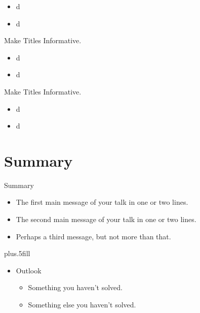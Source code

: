 \documentclass{beamer}
\begin{document}
\begin{frame}{}
    \begin{itemize}
    \item
       d
    \item
        d
    \end{itemize}
\end{frame}

\begin{frame}{Make Titles Informative.}
    \begin{itemize}
    \item
       d
    \item
        d
    \end{itemize}
\end{frame}

\begin{frame}{Make Titles Informative.}
    \begin{itemize}
    \item
       d
    \item
        d
    \end{itemize}
\end{frame}



\section*{Summary}

\begin{frame}{Summary}
  \begin{itemize}
  \item
    The \alert{first main message} of your talk in one or two lines.
  \item
    The \alert{second main message} of your talk in one or two lines.
  \item
    Perhaps a \alert{third message}, but not more than that.
  \end{itemize}
  \vskip0pt plus.5fill
  \begin{itemize}
  \item
    Outlook
    \begin{itemize}
    \item
      Something you haven't solved.
    \item
      Something else you haven't solved.
    \end{itemize}
  \end{itemize}
\end{frame}
\end{document}
